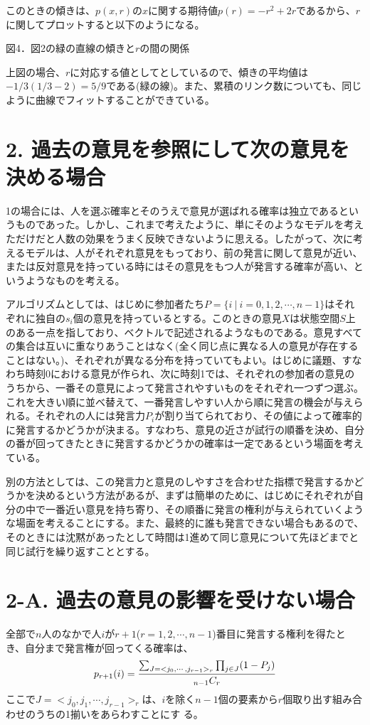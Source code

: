 \documentclass[letterpaper,10pt,english]{sphinxmanual}
\begin{document}
このときの傾きは、\(p(x, r)\)の\(x\)に関する期待値\(p(r)=-r^{2}+2r\)であるから、\(r\)に関してプロットすると以下のようになる。

図4．図2の緑の直線の傾きと\(r\)の間の関係

上図の場合、\(r\)に対応する値としてとしているので、傾きの平均値は\(-1/3(1/3-2) = 5/9\)である(緑の線)。また、累積のリンク数についても、同じように曲線でフィットすることができている。


\section{2. 過去の意見を参照にして次の意見を決める場合}
\label{draft:id6}
1の場合には、人を選ぶ確率とそのうえで意見が選ばれる確率は独立であるというものであった。しかし、これまで考えたように、単にそのようなモデルを考えただけだと人数の効果をうまく反映できないように思える。したがって、次に考えるモデルは、人がそれぞれ意見をもっており、前の発言に関して意見が近い、または反対意見を持っている時にはその意見をもつ人が発言する確率が高い、というようなものを考える。

アルゴリズムとしては、はじめに参加者たち\(P=\{i\ |\ i = 0, 1, 2,\cdots , n-1\}\)はそれぞれに独自の\(s_{i}\)個の意見を持っているとする。このときの意見\(X\)は状態空間\(S\)上のある一点を指しており、ベクトルで記述されるようなものである。意見すべての集合は互いに重なりあうことはなく(全く同じ点に異なる人の意見が存在することはない。)、それぞれが異なる分布を持っていてもよい。はじめに議題、すなわち時刻\(0\)における意見が作られ、次に時刻1では、それぞれの参加者の意見のうちから、一番その意見によって発言されやすいものをそれぞれ一つずつ選ぶ。これを大きい順に並べ替えて、一番発言しやすい人から順に発言の機会が与えられる。それぞれの人には発言力\(P_{i}\)が割り当てられており、その値によって確率的に発言するかどうかが決まる。すなわち、意見の近さが試行の順番を決め、自分の番が回ってきたときに発言するかどうかの確率は一定であるという場面を考えている。

別の方法としては、この発言力と意見のしやすさを合わせた指標で発言するかどうかを決めるという方法があるが、まずは簡単のために、はじめにそれぞれが自分の中で一番近い意見を持ち寄り、その順番に発言の権利が与えられていくような場面を考えることにする。また、最終的に誰も発言できない場合もあるので、そのときには沈黙があったとして時間は1進めて同じ意見について先ほどまでと同じ試行を繰り返すこととする。


\section{2-A. 過去の意見の影響を受けない場合}
\label{draft:id7}
全部で\(n\)人のなかで人\(i\)が\(r+1\)(\(r = 1, 2, \cdots , n-1\))番目に発言する権利を得たとき、自分まで発言権が回ってくる確率は、
\begin{gather}
\begin{split}p_{r+1}(i) = \frac{\sum_{J = <j_{0}, \cdots ,j_{r-1}>_{r}}\prod_{j\in J}(1-P_{j})}{_{n-1}C_{r}}\end{split}\notag
\end{gather}
ここで\(J = <j_{0}, j_{1}, \cdots ,j_{r-1}>_{r}\)は、\(i\)を除く\(n-1\)個の要素から\(r\)個取り出す組み合わせのうちの1揃いをあらわすことにす
る。
\end{document}
